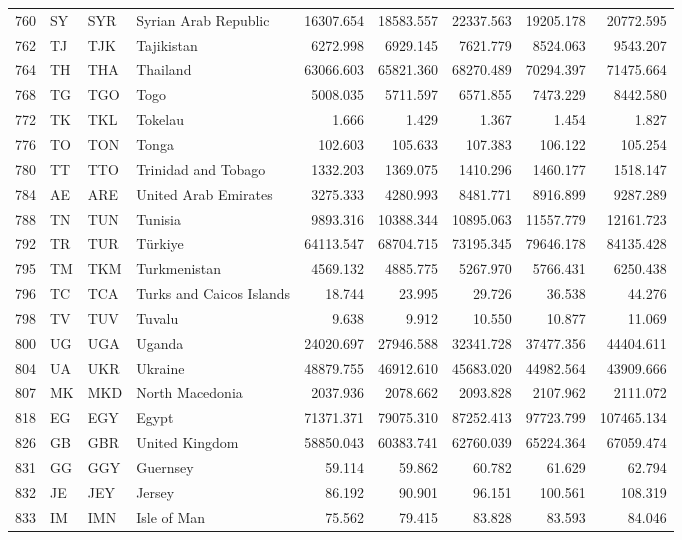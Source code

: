 {\begin{longtable}{rlllrrrrr}
 760 & SY & SYR & Syrian Arab Republic & 16307.654 & 18583.557 & 22337.563 & 19205.178 & 20772.595 \\
 762 & TJ & TJK & Tajikistan & 6272.998 & 6929.145 & 7621.779 & 8524.063 & 9543.207 \\
 764 & TH & THA & Thailand & 63066.603 & 65821.360 & 68270.489 & 70294.397 & 71475.664 \\
 768 & TG & TGO & Togo & 5008.035 & 5711.597 & 6571.855 & 7473.229 & 8442.580 \\
 772 & TK & TKL & Tokelau & 1.666 & 1.429 & 1.367 & 1.454 & 1.827 \\
 776 & TO & TON & Tonga & 102.603 & 105.633 & 107.383 & 106.122 & 105.254 \\
 780 & TT & TTO & Trinidad and Tobago & 1332.203 & 1369.075 & 1410.296 & 1460.177 & 1518.147 \\
 784 & AE & ARE & United Arab Emirates & 3275.333 & 4280.993 & 8481.771 & 8916.899 & 9287.289 \\
 788 & TN & TUN & Tunisia & 9893.316 & 10388.344 & 10895.063 & 11557.779 & 12161.723 \\
 792 & TR & TUR & Türkiye & 64113.547 & 68704.715 & 73195.345 & 79646.178 & 84135.428 \\
 795 & TM & TKM & Turkmenistan & 4569.132 & 4885.775 & 5267.970 & 5766.431 & 6250.438 \\
 796 & TC & TCA & Turks and Caicos Islands & 18.744 & 23.995 & 29.726 & 36.538 & 44.276 \\
 798 & TV & TUV & Tuvalu & 9.638 & 9.912 & 10.550 & 10.877 & 11.069 \\
 800 & UG & UGA & Uganda & 24020.697 & 27946.588 & 32341.728 & 37477.356 & 44404.611 \\
 804 & UA & UKR & Ukraine & 48879.755 & 46912.610 & 45683.020 & 44982.564 & 43909.666 \\
 807 & MK & MKD & North Macedonia & 2037.936 & 2078.662 & 2093.828 & 2107.962 & 2111.072 \\
 818 & EG & EGY & Egypt & 71371.371 & 79075.310 & 87252.413 & 97723.799 & 107465.134 \\
 826 & GB & GBR & United Kingdom & 58850.043 & 60383.741 & 62760.039 & 65224.364 & 67059.474 \\
 831 & GG & GGY & Guernsey & 59.114 & 59.862 & 60.782 & 61.629 & 62.794 \\
 832 & JE & JEY & Jersey & 86.192 & 90.901 & 96.151 & 100.561 & 108.319 \\
 833 & IM & IMN & Isle of Man & 75.562 & 79.415 & 83.828 & 83.593 & 84.046 \\

\end{longtable}}
